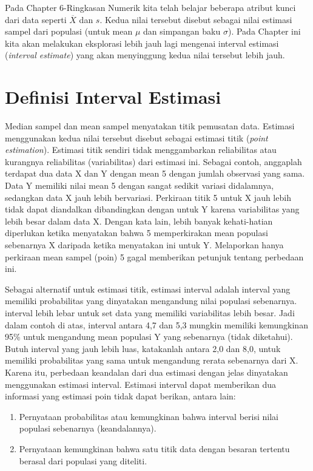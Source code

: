\documentclass[]{book}
\providecommand{\tightlist}{%
  \setlength{\itemsep}{0pt}\setlength{\parskip}{0pt}}
\begin{document}
Pada Chapter 6-Ringkasan Numerik kita telah belajar beberapa atribut
kunci dari data seperti \(\overline{X}\) dan \(s\). Kedua nilai tersebut
disebut sebagai nilai estimasi sampel dari populasi (untuk mean \(\mu\)
dan simpangan baku \(\sigma\)). Pada Chapter ini kita akan melakukan
eksplorasi lebih jauh lagi mengenai interval estimasi (\emph{interval
estimate}) yang akan menyinggung kedua nilai tersebut lebih jauh.

\section{Definisi Interval Estimasi}\label{definisi-interval-estimasi}

Median sampel dan mean sampel menyatakan titik pemusatan data. Estimasi
menggunakan kedua nilai tersebut disebut sebagai estimasi titik
(\emph{point estimation}). Estimasi titik sendiri tidak menggambarkan
reliabilitas atau kurangnya reliabilitas (variabilitas) dari estimasi
ini. Sebagai contoh, anggaplah terdapat dua data X dan Y dengan mean 5
dengan jumlah observasi yang sama. Data Y memiliki nilai mean 5 dengan
sangat sedikit variasi didalamnya, sedangkan data X jauh lebih
bervariasi. Perkiraan titik 5 untuk X jauh lebih tidak dapat diandalkan
dibandingkan dengan untuk Y karena variabilitas yang lebih besar dalam
data X. Dengan kata lain, lebih banyak kehati-hatian diperlukan ketika
menyatakan bahwa 5 memperkirakan mean populasi sebenarnya X daripada
ketika menyatakan ini untuk Y. Melaporkan hanya perkiraan mean sampel
(poin) 5 gagal memberikan petunjuk tentang perbedaan ini.

Sebagai alternatif untuk estimasi titik, estimasi interval adalah
interval yang memiliki probabilitas yang dinyatakan mengandung nilai
populasi sebenarnya. interval lebih lebar untuk set data yang memiliki
variabilitas lebih besar. Jadi dalam contoh di atas, interval antara 4,7
dan 5,3 mungkin memiliki kemungkinan 95\% untuk mengandung mean populasi
Y yang sebenarnya (tidak diketahui). Butuh interval yang jauh lebih
luas, katakanlah antara 2,0 dan 8,0, untuk memiliki probabilitas yang
sama untuk mengandung rerata sebenarnya dari X. Karena itu, perbedaan
keandalan dari dua estimasi dengan jelas dinyatakan menggunakan estimasi
interval. Estimasi interval dapat memberikan dua informasi yang estimasi
poin tidak dapat berikan, antara lain:

\begin{enumerate}
\def\labelenumi{\arabic{enumi}.}
\tightlist
\item
  Pernyataan probabilitas atau kemungkinan bahwa interval berisi nilai
  populasi sebenarnya (keandalannya).
\item
  Pernyataan kemungkinan bahwa satu titik data dengan besaran tertentu
  berasal dari populasi yang diteliti.
\end{enumerate}
\end{document}
